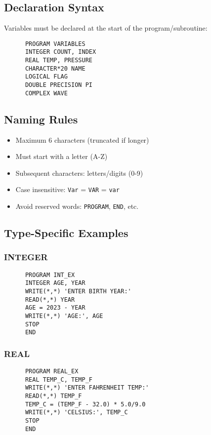 \documentclass{book}
\begin{document}
\subsection*{Declaration Syntax}
Variables must be declared at the start of the program/subroutine:
\begin{verbatim}
      PROGRAM VARIABLES
      INTEGER COUNT, INDEX
      REAL TEMP, PRESSURE
      CHARACTER*20 NAME
      LOGICAL FLAG
      DOUBLE PRECISION PI
      COMPLEX WAVE
\end{verbatim}

\subsection*{Naming Rules}
\begin{itemize}
    \item Maximum 6 characters (truncated if longer)
    \item Must start with a letter (A-Z)
    \item Subsequent characters: letters/digits (0-9)
    \item Case insensitive: \texttt{Var} = \texttt{VAR} = \texttt{var}
    \item Avoid reserved words: \texttt{PROGRAM}, \texttt{END}, etc.
\end{itemize}

\subsection*{Type-Specific Examples}

\subsubsection*{INTEGER}
\begin{verbatim}
      PROGRAM INT_EX
      INTEGER AGE, YEAR
      WRITE(*,*) 'ENTER BIRTH YEAR:'
      READ(*,*) YEAR
      AGE = 2023 - YEAR
      WRITE(*,*) 'AGE:', AGE
      STOP
      END
\end{verbatim}

\subsubsection*{REAL}
\begin{verbatim}
      PROGRAM REAL_EX
      REAL TEMP_C, TEMP_F
      WRITE(*,*) 'ENTER FAHRENHEIT TEMP:'
      READ(*,*) TEMP_F
      TEMP_C = (TEMP_F - 32.0) * 5.0/9.0
      WRITE(*,*) 'CELSIUS:', TEMP_C
      STOP
      END
\end{verbatim}
\end{document}
